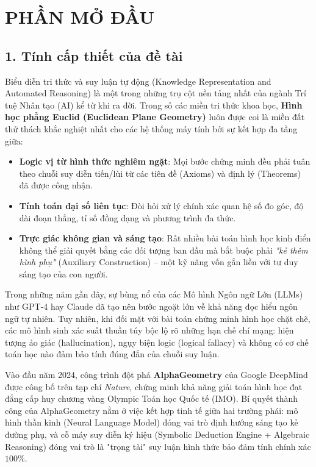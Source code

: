 
\chapter*{PHẦN MỞ ĐẦU}

\section*{1. Tính cấp thiết của đề tài}
Biểu diễn tri thức và suy luận tự động (Knowledge Representation and Automated Reasoning) là một trong những trụ cột nền tảng nhất của ngành Trí tuệ Nhân tạo (AI) kể từ khi ra đời. Trong số các miền tri thức khoa học, \textbf{Hình học phẳng Euclid (Euclidean Plane Geometry)} luôn được coi là miền đất thử thách khắc nghiệt nhất cho các hệ thống máy tính bởi sự kết hợp đa tầng giữa:
\begin{itemize}
    \item \textbf{Logic vị từ hình thức nghiêm ngặt}: Mọi bước chứng minh đều phải tuân theo chuỗi suy diễn tiến/lùi từ các tiên đề (Axioms) và định lý (Theorems) đã được công nhận.
    \item \textbf{Tính toán đại số liên tục}: Đòi hỏi xử lý chính xác quan hệ số đo góc, độ dài đoạn thẳng, tỉ số đồng dạng và phương trình đa thức.
    \item \textbf{Trực giác không gian và sáng tạo}: Rất nhiều bài toán hình học kinh điển không thể giải quyết bằng các đối tượng ban đầu mà bắt buộc phải \textit{"kẻ thêm hình phụ"} (Auxiliary Construction) -- một kỹ năng vốn gắn liền với tư duy sáng tạo của con người.
\end{itemize}

Trong những năm gần đây, sự bùng nổ của các Mô hình Ngôn ngữ Lớn (LLMs) như GPT-4 hay Claude đã tạo nên bước ngoặt lớn về khả năng đọc hiểu ngôn ngữ tự nhiên. Tuy nhiên, khi đối mặt với bài toán chứng minh hình học chặt chẽ, các mô hình sinh xác suất thuần túy bộc lộ rõ những hạn chế chí mạng: hiện tượng ảo giác (hallucination), ngụy biện logic (logical fallacy) và không có cơ chế toán học nào đảm bảo tính đúng đắn của chuỗi suy luận.

Vào đầu năm 2024, công trình đột phá \textbf{AlphaGeometry} của Google DeepMind \cite{trinh2024alphageometry} được công bố trên tạp chí \textit{Nature}, chứng minh khả năng giải toán hình học đạt đẳng cấp huy chương vàng Olympic Toán học Quốc tế (IMO). Bí quyết thành công của AlphaGeometry nằm ở việc kết hợp tinh tế giữa hai trường phái: mô hình thần kinh (Neural Language Model) đóng vai trò định hướng sáng tạo kẻ đường phụ, và cỗ máy suy diễn ký hiệu (Symbolic Deduction Engine + Algebraic Reasoning) đóng vai trò là "trọng tài" suy luận hình thức bảo đảm tính chính xác $100\%$.

